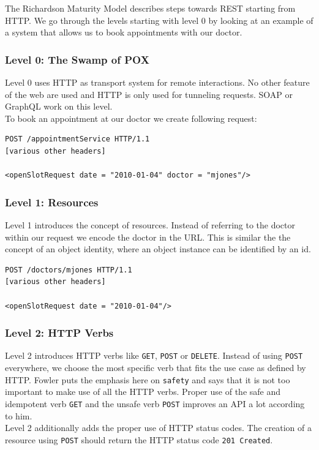 The Richardson Maturity Model describes steps towards REST starting from HTTP. We go through the levels starting with level 0 by looking at an example of a system that allows us to book appointments with our doctor.

\subsubsection{Level 0: The Swamp of POX}

Level 0 uses HTTP as transport system for remote interactions. No other feature of the web are used and HTTP is only used for tunneling requests. SOAP or GraphQL work on this level. \\
To book an appointment at our doctor we create following request:

\lstset{language=XML}
\begin{lstlisting}[caption=Level 0: Remote procedure call on HTTP]
POST /appointmentService HTTP/1.1
[various other headers]

<openSlotRequest date = "2010-01-04" doctor = "mjones"/>
\end{lstlisting}

\subsubsection{Level 1: Resources}

Level 1 introduces the concept of resources. Instead of referring to the doctor within our request we encode the doctor in the URL. This is similar the the concept of an object identity, where an object instance can be identified by an id.

\lstset{language=XML}
\begin{lstlisting}[caption=Level 1: Referring to the doctor as a resource.]
POST /doctors/mjones HTTP/1.1
[various other headers]

<openSlotRequest date = "2010-01-04"/>
\end{lstlisting}

\subsubsection{Level 2: HTTP Verbs}

Level 2 introduces HTTP verbs like \lstinline{GET}, \lstinline{POST} or \lstinline{DELETE}. Instead of using \lstinline{POST} everywhere, we choose the most specific verb that fits the use case as defined by HTTP.
Fowler puts the emphasis here on \lstinline{safety} and says that it is not too important to make use of all the HTTP verbs. Proper use of the safe and idempotent verb \lstinline{GET} and the unsafe verb \lstinline{POST} improves an API a lot according to him. \\
Level 2 additionally adds the proper use of HTTP status codes. The creation of a resource using \lstinline{POST} should return the HTTP status code \lstinline{201 Created}.

